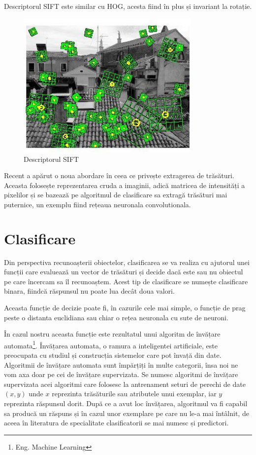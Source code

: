 Descriptorul SIFT este similar cu HOG, acesta fiind în plus și invariant la rotație.
\begin{figure}[H]
	\centering
		\includegraphics[width=0.80\textwidth]{imagini/sift0.jpg}
	\caption{Descriptorul SIFT\protect\footnotemark}
	\label{fig:sift}
\end{figure}

Recent a apărut o noua abordare în ceea ce privește extragerea de trăsături.
Aceasta folosește reprezentarea cruda a imaginii, adică matricea de intensități a pixelilor și se bazează pe algoritmul de clasificare sa extragă trăsături mai puternice, un exemplu fiind rețeaua neuronala convolutionala\cite{lecun-98}.

\section{Clasificare}

Din perspectiva recunoașterii obiectelor, clasificarea se va realiza cu ajutorul unei funcții care evaluează un vector de trăsături și decide dacă este sau nu obiectul pe care încercam sa îl recunoaștem. 
Acest tip de clasificare se numește clasificare binara, fiindcă răspunsul nu poate lua decât doua valori.

Aceasta funcție de decizie poate fi, în cazurile cele mai simple, o funcție de prag peste o distanta euclidiana sau chiar o rețea neuronala cu sute de neuroni.

În cazul nostru aceasta funcție este rezultatul unui algoritm de învățare automata\footnote{Eng. Machine Learning}.
Învățarea automata, o ramura a inteligentei artificiale, este preocupata cu studiul și construcția sistemelor care pot învață din date.
Algoritmii de învățare automata sunt împărțiți în multe categorii, însa noi ne vom axa doar pe cei de învățare supervizata.
Se numesc algoritmi de învățare supervizata acei algoritmi care folosesc la antrenament seturi de perechi de date ${(x,y)}$ unde ${x}$ reprezinta trăsăturile sau atributele unui exemplar, iar ${y}$ reprezinta răspunsul dorit. 
După ce a avut loc învățarea, algoritmul va fi capabil sa producă un răspuns și în cazul unor exemplare pe care nu le-a mai întâlnit, de aceea în literatura de specialitate clasificatorii se mai numesc și predictori.

